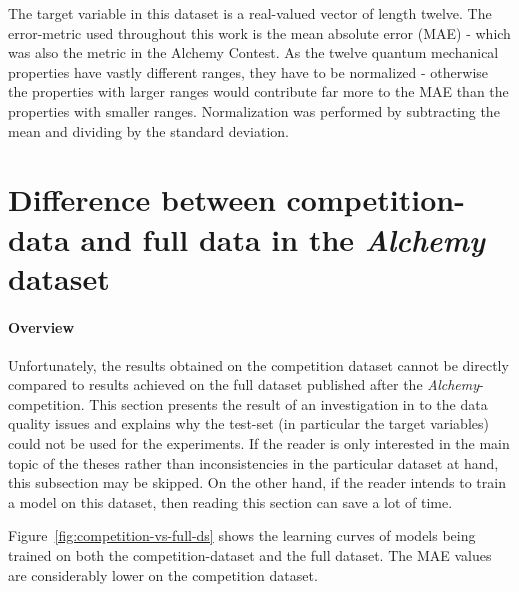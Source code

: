 The target variable in this dataset is a real-valued vector of length twelve. The error-metric used throughout this work is the mean absolute error (MAE) - which was also the metric in the Alchemy Contest. As the twelve quantum mechanical properties have vastly different ranges, they have to be normalized - otherwise the properties with larger ranges would contribute far more to the MAE than the properties with smaller ranges. Normalization was performed by subtracting the mean and dividing by the standard deviation.

\section{Difference between competition-data and full data in the \textit{Alchemy} dataset}
\label{sec:diff-old-new-ds}


\paragraph{Overview} Unfortunately, the results obtained on the competition dataset cannot be directly compared to results achieved on the full dataset published after the \textit{Alchemy}-competition. This section presents the result of an investigation in to the data quality issues and explains why the test-set (in particular the target variables) could not be used for the experiments. If the reader is only interested in the main topic of the theses rather than inconsistencies in the particular dataset at hand, this subsection may be skipped. On the other hand, if the reader intends to train a model on this dataset, then reading this section can save a lot of time.

Figure~\ref{fig:competition-vs-full-ds} shows the learning curves of models being trained on both the competition-dataset and the full dataset. The MAE values are considerably lower on the competition dataset.


